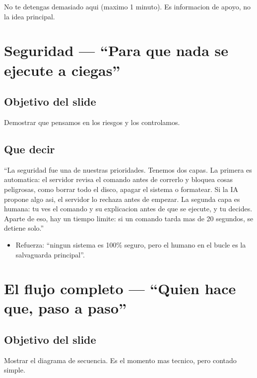 \documentclass[12pt,a4paper]{article}
\begin{document}
\begin{tipbox}
No te detengas demasiado aqui (maximo 1 minuto). Es informacion de apoyo, no la idea principal.
\end{tipbox}

\section{Seguridad --- ``Para que nada se ejecute a ciegas''}
\subsection{Objetivo del slide}
Demostrar que pensamos en los riesgos y los controlamos.

\subsection{Que decir}
\begin{frasebox}
``La seguridad fue una de nuestras prioridades. Tenemos dos capas. La primera es automatica: el servidor revisa el comando antes de correrlo y bloquea cosas peligrosas, como borrar todo el disco, apagar el sistema o formatear. Si la IA propone algo asi, el servidor lo rechaza antes de empezar. La segunda capa es humana: tu ves el comando y su explicacion antes de que se ejecute, y tu decides. Aparte de eso, hay un tiempo limite: si un comando tarda mas de 20 segundos, se detiene solo.''
\end{frasebox}

\begin{itemize}
  \item Refuerza: ``ningun sistema es 100\% seguro, pero el humano en el bucle es la salvaguarda principal''.
\end{itemize}

\section{El flujo completo --- ``Quien hace que, paso a paso''}
\subsection{Objetivo del slide}
Mostrar el diagrama de secuencia. Es el momento mas tecnico, pero contado simple.
\end{document}
